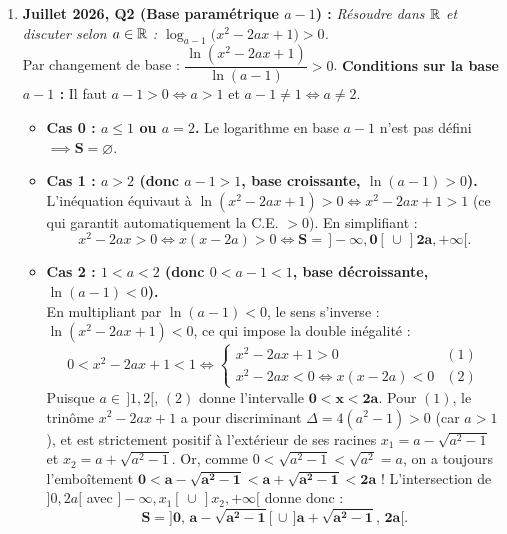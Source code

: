 \begin{exemple}
\begin{enumerate}
    \item \textbf{Juillet 2026, Q2 (Base paramétrique $a - 1$) :} \emph{Résoudre dans $\mathbb{R}$ et discuter selon $a \in \mathbb{R}$ : $\log_{a-1}\bigl(x^2 - 2ax + 1\bigr) > 0$.}\\
    Par changement de base : $\dfrac{\ln(x^2 - 2ax + 1)}{\ln(a - 1)} > 0$.
    \textbf{Conditions sur la base $a - 1$ :} Il faut $a - 1 > 0 \iff a > 1$ et $a - 1 \neq 1 \iff a \neq 2$.
    \begin{itemize}
        \item \textbf{Cas 0 : $a \le 1$ ou $a = 2$.} Le logarithme en base $a - 1$ n'est pas défini $\implies \mathbf{S = \varnothing}$.
        \item \textbf{Cas 1 : $a > 2$ (donc $a - 1 > 1$, base croissante, $\ln(a - 1) > 0$).}\\
        L'inéquation équivaut à $\ln(x^2 - 2ax + 1) > 0 \iff x^2 - 2ax + 1 > 1$ (ce qui garantit automatiquement la C.E. $> 0$). En simplifiant :
        \[
            x^2 - 2ax > 0 \iff x(x - 2a) > 0 \iff \mathbf{S = \,]-\infty, 0[ \,\cup\, ]2a, +\infty[}.
        \]
        \item \textbf{Cas 2 : $1 < a < 2$ (donc $0 < a - 1 < 1$, base décroissante, $\ln(a - 1) < 0$).}\\
        En multipliant par $\ln(a - 1) < 0$, le sens s'inverse : $\ln(x^2 - 2ax + 1) < 0$, ce qui impose la double inégalité :
        \[
            0 < x^2 - 2ax + 1 < 1 \iff \begin{cases} x^2 - 2ax + 1 > 0 & (1) \\ x^2 - 2ax < 0 \iff x(x - 2a) < 0 & (2) \end{cases}
        \]
        Puisque $a \in \,]1, 2[$, $(2)$ donne l'intervalle $\mathbf{0 < x < 2a}$.
        Pour $(1)$, le trinôme $x^2 - 2ax + 1$ a pour discriminant $\Delta = 4(a^2 - 1) > 0$ (car $a > 1$), et est strictement positif à l'extérieur de ses racines $x_1 = a - \sqrt{a^2 - 1}$ et $x_2 = a + \sqrt{a^2 - 1}$.
        Or, comme $0 < \sqrt{a^2 - 1} < \sqrt{a^2} = a$, on a toujours l'emboîtement $\mathbf{0 < a - \sqrt{a^2 - 1} < a + \sqrt{a^2 - 1} < 2a}$ !
        L'intersection de $]0, 2a[$ avec $]-\infty, x_1[ \,\cup\, ]x_2, +\infty[$ donne donc :
        \[
            \mathbf{S = \bigl]0,\, a - \sqrt{a^2 - 1}\bigr[ \,\cup\, \bigl]a + \sqrt{a^2 - 1},\, 2a\bigr[}.
        \]
    \end{itemize}
\end{enumerate}
\end{exemple}

